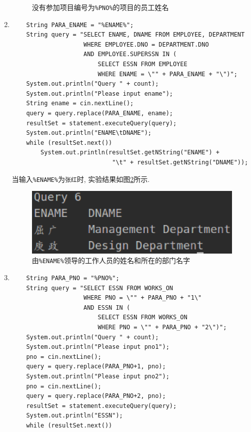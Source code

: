 \documentclass{ML}
\begin{document}
\begin{enumerate}
\begin{figure}[H]
        \caption{没有参加项目编号为\texttt{\%PNO\%}的项目的员工姓名}\label{fig:3.5}
    \end{figure}
    \item \begin{verbatim}
    String PARA_ENAME = "%ENAME%";
    String query = "SELECT ENAME, DNAME FROM EMPLOYEE, DEPARTMENT 
                    WHERE EMPLOYEE.DNO = DEPARTMENT.DNO 
                    AND EMPLOYEE.SUPERSSN IN (
                        SELECT ESSN FROM EMPLOYEE 
                        WHERE ENAME = \"" + PARA_ENAME + "\")";
    System.out.println("Query " + count);
    System.out.println("Please input ename");
    String ename = cin.nextLine();
    query = query.replace(PARA_ENAME, ename);
    resultSet = statement.executeQuery(query);
    System.out.println("ENAME\tDNAME");
    while (resultSet.next())
        System.out.println(resultSet.getNString("ENAME") + 
                            "\t" + resultSet.getNString("DNAME"));
    \end{verbatim}
    当输入\texttt{\%ENAME\%}为\texttt{张红}时, 实验结果如图\ref{fig:3.6}所示.
    \begin{figure}[H]
        \centering
        \includegraphics[scale=0.5, bb = 0 0 334 102]{media/3.6.eps}
        \caption{由\texttt{\%ENAME\%}领导的工作人员的姓名和所在的部门名字}\label{fig:3.6}
    \end{figure}
    \item \begin{verbatim}
    String PARA_PNO = "%PNO%";
    String query = "SELECT ESSN FROM WORKS_ON 
                    WHERE PNO = \"" + PARA_PNO + "1\" 
                    AND ESSN IN (
                        SELECT ESSN FROM WORKS_ON 
                        WHERE PNO = \"" + PARA_PNO + "2\")";
    System.out.println("Query " + count);
    System.out.println("Please input pno1");
    pno = cin.nextLine();
    query = query.replace(PARA_PNO+1, pno);
    System.out.println("Please input pno2");
    pno = cin.nextLine();
    query = query.replace(PARA_PNO+2, pno);
    resultSet = statement.executeQuery(query);
    System.out.println("ESSN");
    while (resultSet.next())

\end{verbatim}
\end{enumerate}
\end{document}
